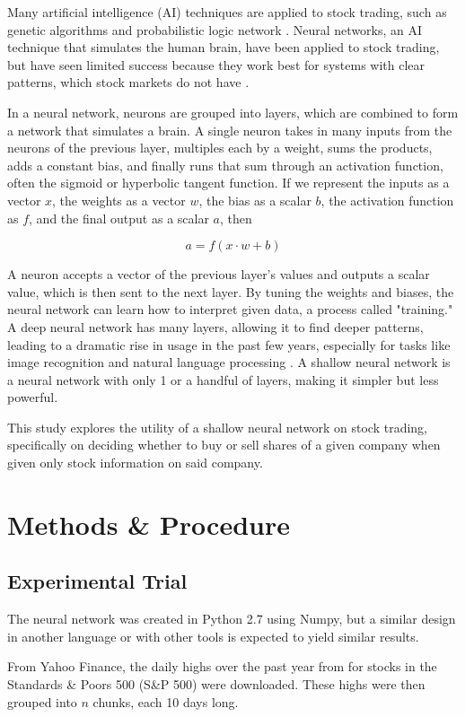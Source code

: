 \documentclass[twocolumn]{article}
\begin{document}
Many artificial intelligence (AI) techniques are applied to stock trading, such as genetic algorithms and probabilistic logic network \cite{wired}. Neural networks, an AI technique that simulates the human brain, have been applied to stock trading, but have seen limited success because they work best for systems with clear patterns, which stock markets do not have \cite{hurwitz}.

In a neural network, neurons are grouped into layers, which are combined to form a network that simulates a brain. A single neuron takes in many inputs from the neurons of the previous layer, multiples each by a weight, sums the products, adds a constant bias, and finally runs that sum through an activation function, often the sigmoid or hyperbolic tangent function. If we represent the inputs as a vector $x$, the weights as a vector $w$, the bias as a scalar $b$, the activation function as $f$, and the final output as a scalar $a$, then

$$a = f ( x \cdot w + b )$$

A neuron accepts a vector of the previous layer's values and outputs a scalar value, which is then sent to the next layer. By tuning the weights and biases, the neural network can learn how to interpret given data, a process called "training." A deep neural network has many layers, allowing it to find deeper patterns, leading to a dramatic rise in usage in the past few years, especially for tasks like image recognition and natural language processing \cite{wired}. A shallow neural network is a neural network with only 1 or a handful of layers, making it simpler but less powerful.

This study explores the utility of a shallow neural network on stock trading, specifically on deciding whether to buy or sell shares of a given company when given only stock information on said company.

\section{Methods \& Procedure}
\subsection{Experimental Trial}
The neural network was created in Python 2.7 using Numpy, but a similar design in another language or with other tools is expected to yield similar results.

From Yahoo Finance, the daily highs over the past year from for stocks in the Standards \& Poors 500 (S\&P 500) were downloaded. These highs were then grouped into $n$ chunks, each 10 days long.
\end{document}
